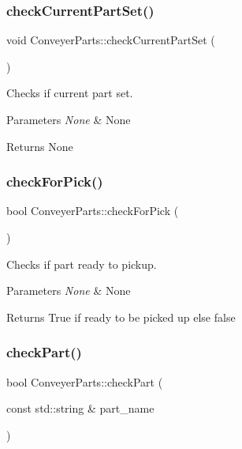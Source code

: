 \subsubsection{\texorpdfstring{check\+Current\+Part\+Set()}{checkCurrentPartSet()}}
{\footnotesize\ttfamily void Conveyer\+Parts\+::check\+Current\+Part\+Set (\begin{DoxyParamCaption}{ }\end{DoxyParamCaption})}



Checks if current part set. 


\begin{DoxyParams}{Parameters}
{\em None} & None \\
\hline
\end{DoxyParams}
\begin{DoxyReturn}{Returns}
None 
\end{DoxyReturn}
\mbox{\label{classConveyerParts_a8a536ff479f28fcb38cf454a41f8387e}} 
\subsubsection{\texorpdfstring{check\+For\+Pick()}{checkForPick()}}
{\footnotesize\ttfamily bool Conveyer\+Parts\+::check\+For\+Pick (\begin{DoxyParamCaption}{ }\end{DoxyParamCaption})}



Checks if part ready to pickup. 


\begin{DoxyParams}{Parameters}
{\em None} & None \\
\hline
\end{DoxyParams}
\begin{DoxyReturn}{Returns}
True if ready to be picked up else false 
\end{DoxyReturn}
\mbox{\label{classConveyerParts_aaa9a8364efc6d4247d8d5585b6b21859}} 
\subsubsection{\texorpdfstring{check\+Part()}{checkPart()}}
{\footnotesize\ttfamily bool Conveyer\+Parts\+::check\+Part (\begin{DoxyParamCaption}\item[{const std\+::string \&}]{part\+\_\+name }\end{DoxyParamCaption})}



